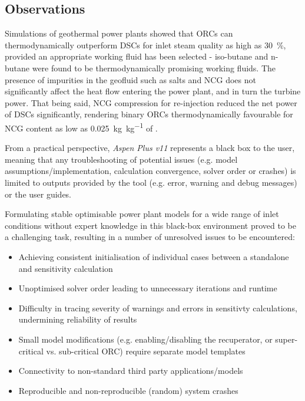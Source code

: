 \subsection{Observations}
    Simulations of geothermal power plants showed that \ac{ORC}s can thermodynamically outperform \ac{DSC}s for inlet steam quality as high as \qty{30}{\percent}, provided an appropriate working fluid has been selected - iso-butane and n-butane were found to be thermodynamically promising working fluids. The presence of impurities in the geofluid such as salts and \ac{NCG} does not significantly affect the heat flow entering the power plant, and in turn the turbine power. That being said, \ac{NCG} compression for re-injection reduced the net power of \ac{DSC}s significantly, rendering binary \ac{ORC}s thermodynamically favourable for \ac{NCG} content as low as \qty{0.025}{\kg\per\kg} of .

    From a practical perspective, \emph{Aspen Plus v11} represents a black box to the user, meaning that any troubleshooting of potential issues (e.g. model assumptions/implementation, calculation convergence, solver order or crashes) is limited to outputs provided by the tool (e.g. error, warning and debug messages) or the user guides. 

    Formulating stable optimisable power plant models for a wide range of inlet conditions without expert knowledge in this black-box environment proved to be a challenging task, resulting in a number of unresolved issues to be encountered:
    \begin{itemize}
        \item Achieving consistent initialisation of individual cases between a standalone and sensitivity calculation
        \item Unoptimised solver order leading to unnecessary iterations and runtime
        \item Difficulty in tracing severity of warnings and errors in sensitivty calculations, undermining reliability of results
        \item Small model modifications (e.g. enabling/disabling the recuperator, or super-critical vs. sub-critical \ac{ORC}) require separate model templates
        \item Connectivity to non-standard third party applications/models
        \item Reproducible and non-reproducible (random) system crashes
    \end{itemize}

\clearpage